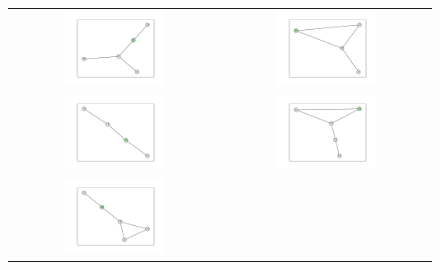\documentclass[12pt, a4paper]{extarticle}
\begin{document}
\begin{figure}\centering\begin{tabularx}{\textwidth}{cc}
\includegraphics[width=0.5\textwidth]{task11-graphlets/5_14-21-18-20-23.pdf} &
\includegraphics[width=0.5\textwidth]{task11-graphlets/4_25-22-23-24.pdf} \\
\includegraphics[width=0.5\textwidth]{task11-graphlets/4_18-25-19-23.pdf} &
\includegraphics[width=0.5\textwidth]{task11-graphlets/5_10-16-21-25-23.pdf} \\
\includegraphics[width=0.5\textwidth]{task11-graphlets/5_18-25-19-22-23.pdf} &

\end{tabularx}
\end{figure}
\end{document}
